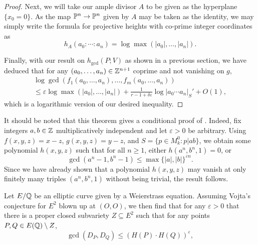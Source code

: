 \begin{proof}
    Next, we will take our ample divisor $A$ to be given as the hyperplane $\{x_0 = 0\}$. 
    As the map $\mathbb{P}^n \to \mathbb{P}^n$ given by $A$ may be taken as the identity,
    we may simply write the formula for projective heights with co-prime integer coordinates as
    \[
        h_A(a_0 : \cdots : a_n) = \log \max(|a_0|, \ldots, |a_n|). 
    \]

    Finally, with our result on $h_{\gcd}(P; V)$ as shown in a previous section,
    we have deduced that for any $(a_0, \ldots, a_n) \in \mathbb{Z}^{n + 1}$ coprime and not vanishing on $g$,
    \begin{multline*}
        \log \gcd(f_1(a_0, \ldots, a_n), \ldots, f_m(a_0, \ldots, a_n)) \\
        \leq \varepsilon \log \max (|a_0|, \ldots, |a_n|)
            + \frac{1}{r - 1 + \delta \varepsilon} \log |a_0 \cdots a_n|_S' + O(1),
    \end{multline*}
    which is a logarithmic version of our desired inequality.
\end{proof}

\begin{remark}
    It should be noted that this theorem gives a conditional proof of \cite{BCZ_2002}.
    Indeed, fix integers $a, b \in \mathbb{Z}$ multiplicatively independent and let $\varepsilon > 0$ be arbitrary.
    Using $f(x, y, z) = x - z$, $g(x, y, z) = y - z$, and $S = \{ p \in M_k^0 : p | ab \}$,
    we obtain some polynomial $h(x, y, z)$ such that for all $n \geq 1$,
    either $h(a^n, b^n, 1) = 0$, or
    \[
        \gcd(a^n - 1, b^n - 1) \leq \max\{|a|, |b|\}^{\varepsilon n}.
    \]
    Since we have already shown that a polynomial $h(x, y, z)$ may vanish at only finitely many triples $(a^n, b^n, 1)$ without being trivial,
    the result follows.
\end{remark}

\begin{theorem}
    Let $E/ \mathbb{Q}$ be an elliptic curve given by a Weierstrass equation.
    Assuming Vojta's conjecture for $E^2$ blown up at $(O, O)$,
    we then find that for any $\varepsilon > 0$ that there is a proper closed subvariety $Z \subseteq E^2$ such that for any points $P, Q \in E(\mathbb{Q}) \setminus Z$,
    \[
        \gcd(D_P, D_Q) \leq (H(P) \cdot H(Q))^\varepsilon,
    \]
\end{theorem}


